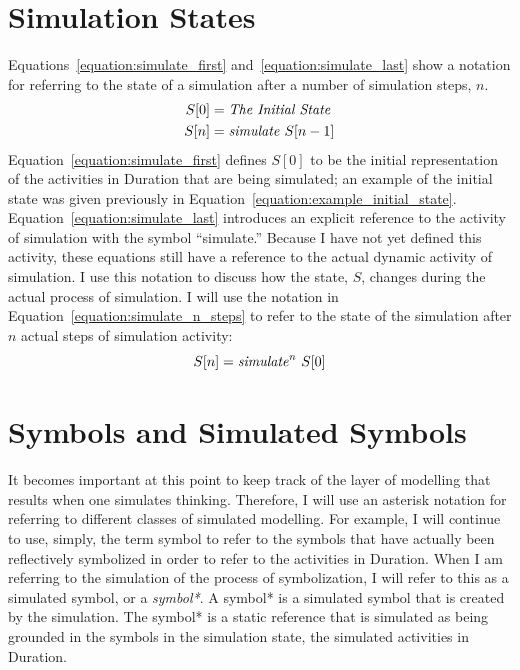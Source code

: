 \section{Simulation States}

Equations~\ref{equation:simulate_first}
and~\ref{equation:simulate_last} show a notation for referring to the
state of a simulation after a number of simulation steps, $n$.
\begin{align}
\label{equation:simulate_first}
S[0] &= \text{\emph{The Initial State}} \\
\label{equation:simulate_last}
S[n] &= \text{\emph{simulate}}~S[n-1]
\end{align}
Equation~\ref{equation:simulate_first} defines $S[0]$ to be
the initial representation of the activities in Duration that are
being simulated; an example of the initial state was given previously
in Equation~\ref{equation:example_initial_state}.
Equation~\ref{equation:simulate_last} introduces an explicit reference
to the activity of simulation with the symbol ``simulate.''  Because I
have not yet defined this activity, these equations still have a
reference to the actual dynamic activity of simulation.  I use this
notation to discuss how the state, $S$, changes during the
actual process of simulation.  I will use the notation in
Equation~\ref{equation:simulate_n_steps} to refer to the state of the
simulation after $n$ actual steps of simulation activity:
\begin{equation}
\label{equation:simulate_n_steps}
S[n] = \text{\emph{simulate}}^n~S[0]
\end{equation}




\section{Symbols and Simulated Symbols}

It becomes important at this point to keep track of the layer of
modelling that results when one simulates thinking.  Therefore, I will
use an asterisk notation for referring to different classes of
simulated modelling.  For example, I will continue to use, simply, the
term symbol to refer to the symbols that have actually been
reflectively symbolized in order to refer to the activities in
Duration.  When I am referring to the simulation of the process of
symbolization, I will refer to this as a simulated symbol, or a
\emph{symbol*}.  A symbol* is a simulated symbol that is created by
the simulation.  The symbol* is a static reference that is simulated
as being grounded in the symbols in the simulation state, the
simulated activities in Duration.

